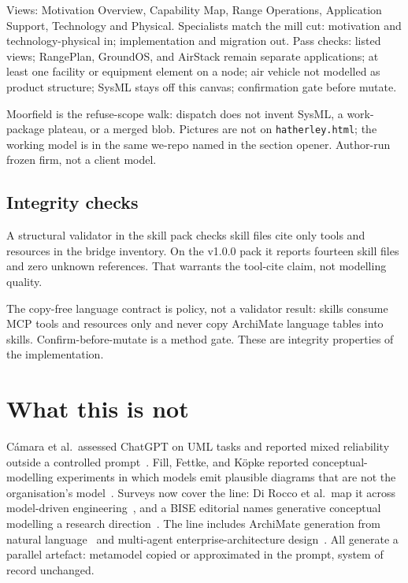 \documentclass[10pt,journal,compsoc]{IEEEtran}
\begin{document}
Views: Motivation Overview, Capability Map, Range Operations, Application Support, Technology and Physical. Specialists match the mill cut: motivation and technology-physical in; implementation and migration out. Pass checks: listed views; RangePlan, GroundOS, and AirStack remain separate applications; at least one facility or equipment element on a node; air vehicle not modelled as product structure; SysML stays off this canvas; confirmation gate before mutate.

Moorfield is the refuse-scope walk: dispatch does not invent SysML, a work-package plateau, or a merged blob. Pictures are not on \texttt{hatherley.html}; the working model is in the same we-repo named in the section opener. Author-run frozen firm, not a client model.

\subsection{Integrity checks}

A structural validator in the skill pack checks skill files cite only tools and resources in the bridge inventory. On the v1.0.0 pack it reports fourteen skill files and zero unknown references. That warrants the tool-cite claim, not modelling quality.

The copy-free language contract is policy, not a validator result: skills consume MCP tools and resources only and never copy ArchiMate language tables into skills. Confirm-before-mutate is a method gate. These are integrity properties of the implementation.

\section{What this is not}

C{\'a}mara et al.\ assessed ChatGPT on UML tasks and reported mixed reliability outside a controlled prompt~\cite{camara2023}. Fill, Fettke, and K{\"o}pke reported conceptual-modelling experiments in which models emit plausible diagrams that are not the organisation's model~\cite{fill2023}. Surveys now cover the line: Di Rocco et al.\ map it across model-driven engineering~\cite{dirrocco2025}, and a BISE editorial names generative conceptual modelling a research direction~\cite{fill2026}. The line includes ArchiMate generation from natural language~\cite{nast2026} and multi-agent enterprise-architecture design~\cite{chen2024}. All generate a parallel artefact: metamodel copied or approximated in the prompt, system of record unchanged.
\end{document}

